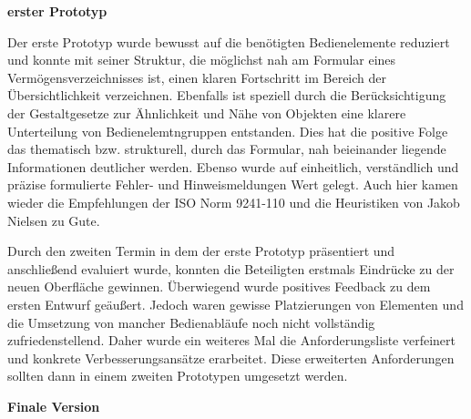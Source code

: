 \textbf{erster Prototyp}

Der erste Prototyp wurde bewusst auf die benötigten Bedienelemente reduziert und konnte mit seiner Struktur, die möglichst nah am Formular eines Vermögensverzeichnisses ist, einen klaren Fortschritt im Bereich der Übersichtlichkeit verzeichnen. Ebenfalls ist speziell durch die Berücksichtigung der Gestaltgesetze zur Ähnlichkeit und Nähe von Objekten eine klarere Unterteilung von Bedienelemtngruppen entstanden. Dies hat die positive Folge das thematisch bzw. strukturell, durch das Formular, nah beieinander liegende Informationen deutlicher werden. Ebenso wurde auf einheitlich, verständlich und präzise formulierte Fehler- und Hinweismeldungen Wert gelegt. Auch hier kamen wieder die Empfehlungen der ISO Norm 9241-110 und die Heuristiken von Jakob Nielsen zu Gute.

Durch den zweiten Termin in dem der erste Prototyp präsentiert und anschließend evaluiert wurde, konnten die Beteiligten erstmals Eindrücke zu der neuen Oberfläche gewinnen. Überwiegend wurde positives Feedback zu dem ersten Entwurf geäußert. Jedoch waren gewisse Platzierungen von Elementen und die Umsetzung von mancher Bedienabläufe noch nicht vollständig zufriedenstellend. Daher wurde ein weiteres Mal die Anforderungsliste verfeinert und konkrete Verbesserungsansätze erarbeitet. Diese erweiterten Anforderungen sollten dann in einem zweiten Prototypen umgesetzt werden.

\textbf{Finale Version}

